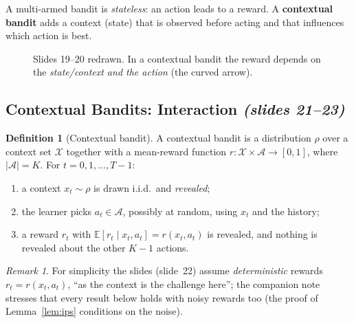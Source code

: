 \documentclass[11pt,a4paper]{article}
\newcommand{\E}{\mathbb{E}}
\newcommand{\calA}{\mathcal{A}}
\newcommand{\calX}{\mathcal{X}}
\newcommand{\slides}[1]{\emph{(slides #1)}}
\theoremstyle{plain}
\theoremstyle{definition}
\newtheorem{definition}[theorem]{Definition}
\theoremstyle{remark}
\newtheorem*{remark}{Remark}
\begin{document}
A multi-armed bandit is \emph{stateless}: an action leads to a reward. A \textbf{contextual bandit} adds a context (state)
that is observed before acting and that influences which action is best.

\begin{figure}[ht]
\centering
{}
\caption{Slides 19--20 redrawn. In a contextual bandit the reward depends on the \emph{state/context and the action}
(the curved arrow).}
\end{figure}

\subsection{Contextual Bandits: Interaction \slides{21--23}}

\begin{definition}[Contextual bandit]\label{def:cb}
A contextual bandit is a distribution $\rho$ over a context set $\calX$ together with a mean-reward function
$r:\calX\times\calA\to[0,1]$, where $|\calA|=K$. For $t=0,1,\dots,T-1$:
\begin{enumerate}
 \item a context $x_t\sim\rho$ is drawn i.i.d.\ and \emph{revealed};
 \item the learner picks $a_t\in\calA$, possibly at random, using $x_t$ and the history;
 \item a reward $r_t$ with $\E[r_t\mid x_t,a_t]=r(x_t,a_t)$ is revealed, and nothing is revealed about the other $K-1$ actions.
\end{enumerate}
\end{definition}

\begin{remark}
For simplicity the slides (slide~22) assume \emph{deterministic} rewards $r_t=r(x_t,a_t)$, ``as the context is the challenge here'';
the companion note stresses that every result below holds with noisy rewards too (the proof of Lemma~\ref{lem:ips}
conditions on the noise).
\end{remark}
\end{document}
